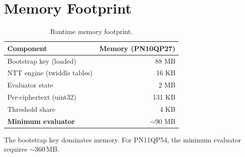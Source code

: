 \section{Memory Footprint}


\begin{table}[h]
\centering
\begin{tabular}{@{}lr@{}}
\toprule
\textbf{Component} & \textbf{Memory (PN10QP27)} \\
\midrule
Bootstrap key (loaded) & 88 MB \\
NTT engine (twiddle tables) & 16 KB \\
Evaluator state & 2 MB \\
Per-ciphertext (uint32) & 131 KB \\
Threshold share & 4 KB \\
\midrule
\textbf{Minimum evaluator} & $\sim$90 MB \\
\bottomrule
\end{tabular}
\caption{Runtime memory footprint.}
\label{tab:memory}
\end{table}

The bootstrap key dominates memory. For PN11QP54, the minimum evaluator requires $\sim$360\,MB.

